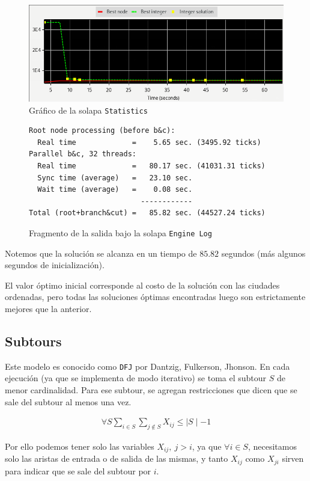 \documentclass[titlepage,a4paper,oneside]{article}
\begin{document}
\begin{figure}[H]
\centering
\includegraphics[width=\textwidth]{images/MTZ.png}
\caption{Gráfico de la solapa \texttt{Statistics}}
\end{figure}

\begin{figure}[H]
\begin{verbatim}
Root node processing (before b&c):
  Real time             =    5.65 sec. (3495.92 ticks)
Parallel b&c, 32 threads:
  Real time             =   80.17 sec. (41031.31 ticks)
  Sync time (average)   =   23.10 sec.
  Wait time (average)   =    0.08 sec.
                          ------------
Total (root+branch&cut) =   85.82 sec. (44527.24 ticks)
\end{verbatim}
\caption{Fragmento de la salida bajo la solapa \texttt{Engine Log}}
\end{figure}

Notemos que la solución se alcanza en un tiempo de $85.82$ segundos (más algunos segundos de inicialización).

El valor óptimo inicial corresponde al costo de la solución con las ciudades ordenadas, pero todas las soluciones óptimas encontradas luego son estrictamente mejores que la anterior.

\subsection{Subtours}\label{Subtours}
Este modelo es conocido como \texttt{DFJ} por Dantzig, Fulkerson, Jhonson. En cada ejecución  (ya que se implementa de modo iterativo) se toma el subtour $S$ de menor cardinalidad. Para ese subtour, se agregan restricciones que dicen que se sale del subtour al menos una vez.

\begin{align}
	\forall S \sum_{i \in S} \sum_{j \notin S} X_{ij} \leq \mid S \mid - 1
\end{align}

Por ello podemos tener solo las variables $X_{ij},~j >i$, ya que $\forall i \in S$, necesitamos solo las aristas de entrada o de salida de las mismas, y tanto $X_{ij}$ como $X_{ji}$ sirven para indicar que se sale del subtour por $i$.
\end{document}
